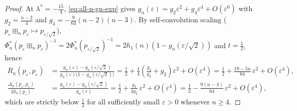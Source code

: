 \documentclass[11pt,a4paper]{article}
\theoremstyle{definition}
\newcommand{\boxplusn}{\boxplus_n}
\begin{document}
\begin{proof}
At $\lambda^* = -\frac{15}{4}$, \eqref{eq:all-n-gn-exp} gives $g_n(\varepsilon) = g_2\varepsilon^2 + g_4\varepsilon^4 + O(\varepsilon^6)$ with $g_2 = \frac{n-2}{4}$ and $g_4 = -\frac{9}{64}(n-2)(n-3)$. By self-convolution scaling ($p_\varepsilon \boxplusn p_\varepsilon \mapsto p_{\varepsilon/\sqrt{2}}$), $\Phi_n^*(p_\varepsilon \boxplusn p_\varepsilon)^{-1} = 2\Phi_n^*(p_{\varepsilon/\sqrt{2}})^{-1} = 2 h_1(n)(1 - g_n(\varepsilon/\sqrt{2}))$ and $t = \frac{1}{2}$, hence
\begin{align*}
R_n(p_\varepsilon, p_\varepsilon)
&= \frac{g_n(\varepsilon) - g_n(\varepsilon/\sqrt{2})}{g_n(\varepsilon)\bigl(1 - g_n(\varepsilon/\sqrt{2})\bigr)}
= \frac{1}{2} + \frac{1}{4}\!\left(\frac{g_4}{g_2} + g_2\right)\varepsilon^2 + O(\varepsilon^4)
= \frac{1}{2} + \frac{19 - 5n}{64}\,\varepsilon^2 + O(\varepsilon^4), \\
\frac{\Delta_n(p_\varepsilon, p_\varepsilon)}{2\delta_n(p_\varepsilon)}
&= \frac{g_n(\varepsilon) - g_n(\varepsilon/\sqrt{2})}{g_n(\varepsilon)}
= \frac{1}{2} + \frac{g_4}{4 g_2}\,\varepsilon^2 + O(\varepsilon^4)
= \frac{1}{2} - \frac{9(n-3)}{64}\,\varepsilon^2 + O(\varepsilon^4),
\end{align*}
which are strictly below $\frac{1}{2}$ for all sufficiently small $\varepsilon > 0$ whenever $n \ge 4$.


\end{proof}
\end{document}
